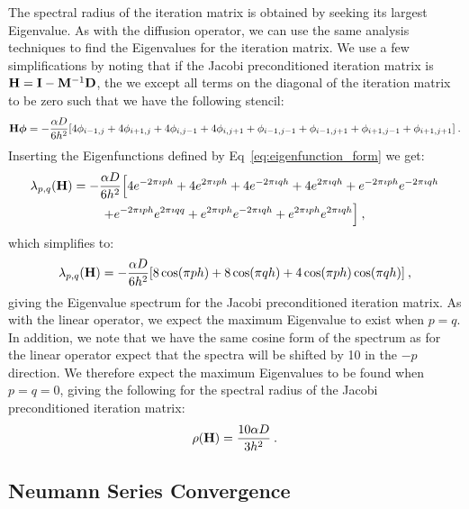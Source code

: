 \documentclass{mc2013}
\begin{document}
The spectral radius of the iteration matrix is obtained by seeking its
largest Eigenvalue. As with the diffusion operator, we can use the
same analysis techniques to find the Eigenvalues for the iteration
matrix. We use a few simplifications by noting that if the Jacobi
preconditioned iteration matrix is $\mathbf{H} = \mathbf{I} -
\mathbf{M}^{-1}\mathbf{D}$, the we except all terms on the diagonal of the
iteration matrix to be zero such that we have the following stencil:
\begin{equation}
  \mathbf{H}\boldsymbol{\phi} = -\frac{\alpha D}{6h^2}[4 \phi_{i-1,j}
    + 4 \phi_{i+1,j} + 4 \phi_{i,j-1} + 4 \phi_{i,j+1} +
    \phi_{i-1,j-1} + \phi_{i-1,j+1} + \phi_{i+1,j-1} +
    \phi_{i+1,j+1}]\:.
  \label{eq:iteration_stencil}
\end{equation}
Inserting the Eigenfunctions defined by Eq~\ref{eq:eigenfunction_form}
we get:
\begin{multline}
  \lambda_{p,q}(\mathbf{H}) = -\frac{\alpha D}{6h^2}\Big[4 e^{-2 \pi \imath p
      h} + 4 e^{2 \pi \imath p h} + 4 e^{-2 \pi \imath q h} + 4 e^{2
      \pi \imath q h} + e^{-2 \pi \imath p h} e^{-2 \pi \imath q h}
    \\ + e^{-2 \pi \imath p h} e^{2 \pi \imath q q} + e^{2 \pi \imath
      p h} e^{-2 \pi \imath q h} + e^{2 \pi \imath p h} e^{2 \pi
      \imath q h}\Big]\:,
  \label{eq:iteration_deriv}
\end{multline}
which simplifies to:
\begin{equation}
  \lambda_{p,q}(\mathbf{H}) = -\frac{\alpha D}{6h^2}[ 8 \cos(\pi p h) + 8
    \cos(\pi q h) + 4 \cos(\pi p h) \cos(\pi q h)]\:,
  \label{eq:iteration_spectrum}
\end{equation}
giving the Eigenvalue spectrum for the Jacobi preconditioned iteration
matrix. As with the linear operator, we expect the maximum Eigenvalue
to exist when $p=q$. In addition, we note that we have the same cosine
form of the spectrum as for the linear operator expect that the
spectra will be shifted by 10 in the $-p$ direction. We therefore
expect the maximum Eigenvalues to be found when $p=q=0$, giving the
following for the spectral radius of the Jacobi preconditioned
iteration matrix:
\begin{equation}
  \rho(\mathbf{H}) = \frac{10 \alpha D}{3 h^2}\:.
  \label{eq:iteration_radius}
\end{equation}

\subsection{Neumann Series Convergence}
\label{subsec:neumann_convergence}
\end{document}
